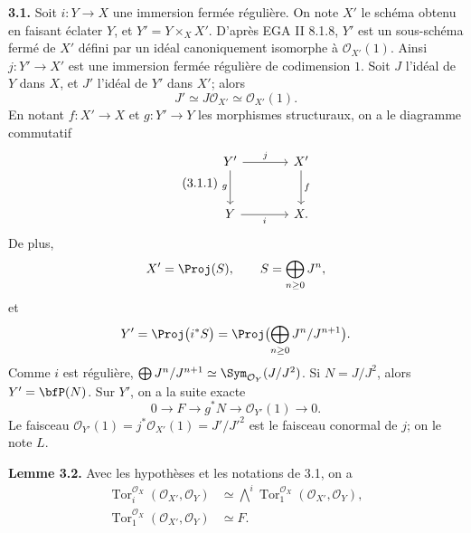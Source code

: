 \documentclass[11pt]{article}
\newcommand{\Tor}{\operatorname{Tor}}
\providecommand{\Tor}{\operatorname{Tor}}
\providecommand{\cO}{\mathcal O}
\begin{document}
\textbf{3.1.} Soit \(i:Y\to X\) une immersion fermée régulière. On note \(X'\) le schéma obtenu en faisant éclater \(Y\), et \(Y'=Y\times_X X'\). D'après EGA II 8.1.8, \(Y'\) est un sous-schéma fermé de \(X'\) défini par un idéal canoniquement isomorphe à \(\cO_{X'}(1)\). Ainsi \(j:Y'\to X'\) est une immersion fermée régulière de codimension \(1\). Soit \(J\) l'idéal de \(Y\) dans \(X\), et \(J'\) l'idéal de \(Y'\) dans \(X'\); alors
\[
J'\simeq J\cO_{X'}\simeq\cO_{X'}(1).
\]
En notant \(f:X'\to X\) et \(g:Y'\to Y\) les morphismes structuraux, on a le diagramme commutatif
\begin{equation}\tag{3.1.1}
\begin{tikzcd}[column sep=large,row sep=large]
Y' \arrow[r,"j"] \arrow[d,"g"'] & X' \arrow[d,"f"]\\
Y \arrow[r,"i"'] & X.
\end{tikzcd}
\end{equation}
De plus,
\[
X'=\Proj(S),\qquad S=\bigoplus_{n\ge0}J^n,
\]
et
\[
Y'=\Proj\bigl(i^*S\bigr)
=\Proj\bigl(\bigoplus_{n\ge0}J^n/J^{n+1}\bigr).
\]
Comme \(i\) est régulière, \(\bigoplus J^n/J^{n+1}\simeq\Sym_{\cO_Y}(J/J^2)\). Si \(N=J/J^2\), alors \(Y'=\bfP(N)\). Sur \(Y'\), on a la suite exacte
\begin{equation}\tag{3.1.2}
0\to F\to g^*N\to\cO_{Y'}(1)\to0.
\end{equation}
Le faisceau \(\cO_{Y'}(1)=j^*\cO_{X'}(1)=J'/J'^2\) est le faisceau conormal de \(j\); on le note \(L\).

\textbf{Lemme 3.2.} Avec les hypothèses et les notations de 3.1, on a
\begin{align}
\Tor_i^{\cO_X}(\cO_{X'},\cO_Y)&\simeq
\bigwedge^i\Tor_1^{\cO_X}(\cO_{X'},\cO_Y),\tag{3.2.i}\\
\Tor_1^{\cO_X}(\cO_{X'},\cO_Y)&\simeq F.\tag{3.2.ii}
\end{align}
\end{document}
